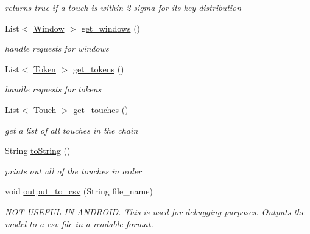 \begin{DoxyCompactItemize}
\begin{DoxyCompactList}\small\item\em returns true if a touch is within 2 sigma for it\textquotesingle{}s key distribution \end{DoxyCompactList}\item 
List$<$ \hyperlink{classcomponents_1_1_window}{Window} $>$ \hyperlink{classcomponents_1_1_chain_a48f2e0718eb4a400c6ceb23afb0ea162}{get\+\_\+windows} ()
\begin{DoxyCompactList}\small\item\em handle requests for windows \end{DoxyCompactList}\item 
List$<$ \hyperlink{classcomponents_1_1_token}{Token} $>$ \hyperlink{classcomponents_1_1_chain_aed8e3b1ca179438db491b35a2eee822b}{get\+\_\+tokens} ()
\begin{DoxyCompactList}\small\item\em handle requests for tokens \end{DoxyCompactList}\item 
List$<$ \hyperlink{classcomponents_1_1_touch}{Touch} $>$ \hyperlink{classcomponents_1_1_chain_affd01133384c5cb222448c76ab0a82fb}{get\+\_\+touches} ()
\begin{DoxyCompactList}\small\item\em get a list of all touches in the chain \end{DoxyCompactList}\item 
String \hyperlink{classcomponents_1_1_chain_ac5496e565687d95b78cbc2d34bbb2ba2}{to\+String} ()
\begin{DoxyCompactList}\small\item\em prints out all of the touches in order \end{DoxyCompactList}\item 
void \hyperlink{classcomponents_1_1_chain_acf107be5a3d4e0dc151f07e0c519f698}{output\+\_\+to\+\_\+csv} (String file\+\_\+name)
\begin{DoxyCompactList}\small\item\em N\+OT U\+S\+E\+F\+UL IN A\+N\+D\+R\+O\+ID. This is used for debugging purposes. Outputs the model to a csv file in a readable format. \end{DoxyCompactList}\end{DoxyCompactItemize}


